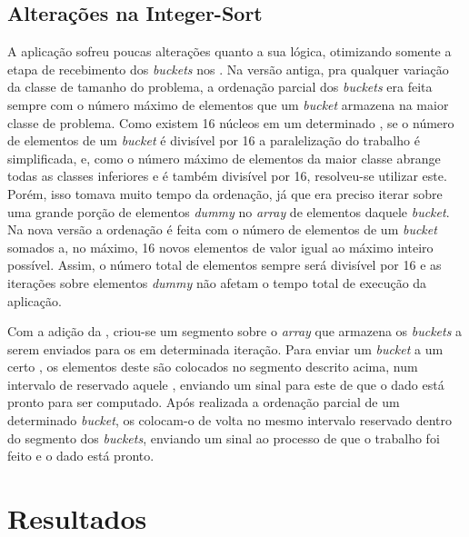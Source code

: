 \section{Alterações na Integer-Sort}
\label{sec:alteracoesis}

A aplicação \IS sofreu poucas alterações quanto a sua lógica, otimizando somente a etapa de recebimento dos \textit{buckets} nos \slaves. Na versão antiga, pra qualquer variação da classe de tamanho do problema, a ordenação parcial dos \textit{buckets} era feita sempre com o número máximo de elementos que um \textit{bucket} armazena na maior classe de problema. Como existem 16 núcleos em um determinado \cluster, se o número de elementos de um \textit{bucket} é divisível por 16 a paralelização do trabalho é simplificada, e, como o número máximo de elementos da maior classe abrange todas as classes inferiores e é também divisível por 16, resolveu-se utilizar este. Porém, isso tomava muito tempo da ordenação, já que era preciso iterar sobre uma grande porção de elementos \textit{dummy} no \textit{array} de elementos daquele \textit{bucket}. Na nova versão a ordenação é feita com o número de elementos de um \textit{bucket} somados a, no máximo, 16 novos elementos de valor igual ao máximo inteiro possível. Assim, o número total de elementos sempre será divisível por 16 e as iterações sobre elementos \textit{dummy} não afetam o tempo total de execução da aplicação.

Com a adição da \API \ASYNC, criou-se um segmento sobre o \textit{array} que armazena os \textit{buckets} a serem enviados para os \CCs em determinada iteração. Para enviar um \textit{bucket} a um certo \CC, os elementos deste são colocados no segmento descrito acima, num intervalo de \offsets reservado aquele \CC, enviando um sinal para este \slave de que o dado está pronto para ser computado. Após realizada a ordenação parcial de um determinado \textit{bucket}, os \CCs colocam-o de volta no mesmo intervalo reservado dentro do segmento dos \textit{buckets}, enviando um sinal ao processo \master de que o trabalho foi feito e o dado está pronto.
 
\chapter{Resultados}
\label{ch:resultados}


